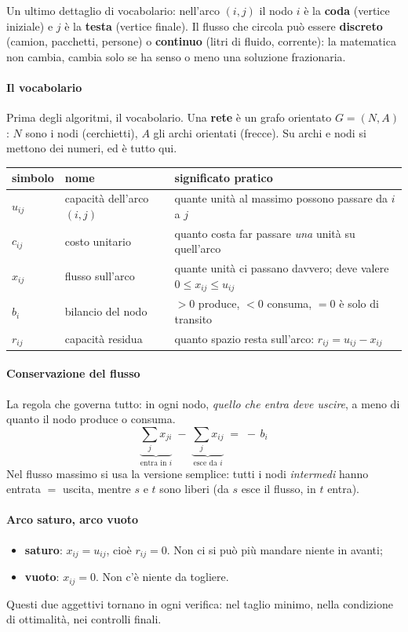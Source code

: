 \documentclass[12pt]{extarticle} %
\begin{document}
\noindent Un ultimo dettaglio di vocabolario: nell'arco $(i,j)$ il nodo $i$ è la \textbf{coda} (vertice iniziale) e $j$ è la \textbf{testa} (vertice finale). Il flusso che circola può essere \textbf{discreto} (camion, pacchetti, persone) o \textbf{continuo} (litri di fluido, corrente): la matematica non cambia, cambia solo se ha senso o meno una soluzione frazionaria.

\paragraph{Il vocabolario}
Prima degli algoritmi, il vocabolario. Una \textbf{rete} è un grafo orientato $G = (N,A)$: $N$ sono i nodi (cerchietti), $A$ gli archi orientati (frecce). Su archi e nodi si mettono dei numeri, ed è tutto qui.
\begin{center}
\begin{tabular}{lll}
\hline
\textbf{simbolo} & \textbf{nome} & \textbf{significato pratico} \\
\hline
$u_{ij}$ & capacità dell'arco $(i,j)$ & quante unità al massimo possono passare da $i$ a $j$ \\
$c_{ij}$ & costo unitario & quanto costa far passare \emph{una} unità su quell'arco \\
$x_{ij}$ & flusso sull'arco & quante unità ci passano davvero; deve valere $0 \le x_{ij} \le u_{ij}$ \\
$b_i$ & bilancio del nodo & $>0$ produce, $<0$ consuma, $=0$ è solo di transito \\
$r_{ij}$ & capacità residua & quanto spazio resta sull'arco: $r_{ij} = u_{ij} - x_{ij}$ \\
\hline
\end{tabular}
\end{center}

\paragraph{Conservazione del flusso}
La regola che governa tutto: in ogni nodo, \emph{quello che entra deve uscire}, a meno di quanto il nodo produce o consuma.
\[
\underbrace{\sum_{j} x_{ji}}_{\text{entra in } i} \;-\; \underbrace{\sum_{j} x_{ij}}_{\text{esce da } i} \;=\; -\,b_i
\]
Nel flusso massimo si usa la versione semplice: tutti i nodi \emph{intermedi} hanno entrata $=$ uscita, mentre $s$ e $t$ sono liberi (da $s$ esce il flusso, in $t$ entra).

\paragraph{Arco saturo, arco vuoto}
\begin{itemize}
    \item \textbf{saturo}: $x_{ij} = u_{ij}$, cioè $r_{ij} = 0$. Non ci si può più mandare niente in avanti;
    \item \textbf{vuoto}: $x_{ij} = 0$. Non c'è niente da togliere.
\end{itemize}
Questi due aggettivi tornano in ogni verifica: nel taglio minimo, nella condizione di ottimalità, nei controlli finali.
\end{document}

